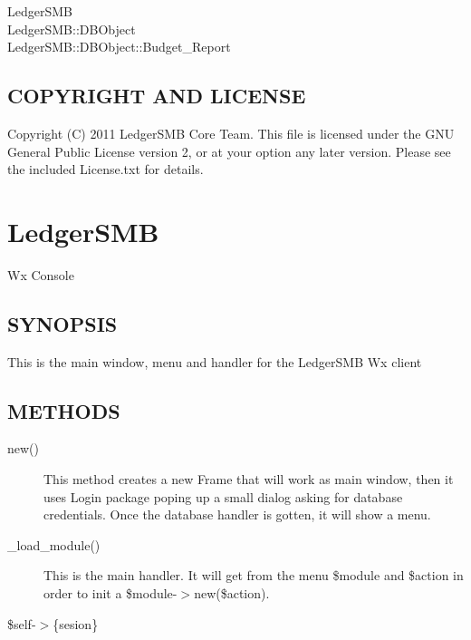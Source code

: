 \begin{description}
\begin{description}
\item[{LedgerSMB}] \mbox{}
\item[{LedgerSMB::DBObject}] \mbox{}
\item[{LedgerSMB::DBObject::Budget\_Report}] \mbox{}\end{description}
\subsection*{COPYRIGHT AND LICENSE\label{LedgerSMB::DBObject::Budget_COPYRIGHT_AND_LICENSE}}


Copyright (C) 2011 LedgerSMB Core Team.  This file is licensed under the GNU 
General Public License version 2, or at your option any later version.  Please
see the included License.txt for details.

\section{LedgerSMB\label{LedgerSMB}}


Wx Console

\subsection*{SYNOPSIS\label{LedgerSMB_SYNOPSIS}}


This is the main window, menu and handler for the LedgerSMB Wx client

\subsection*{METHODS\label{LedgerSMB_METHODS}}
\begin{description}

\item[{new()}] \mbox{}

This method creates a new Frame that will work as main window, then it uses Login package poping up
a small dialog asking for database credentials. Once the database handler is gotten, it will show
a menu.


\item[{\_load\_module()}] \mbox{}

This is the main handler. It will get from the menu \$module and \$action in order to init a \$module-$>$new(\$action).


\item[{\$self-$>$\{sesion\}}] \mbox{}


\end{description}
\end{description}
